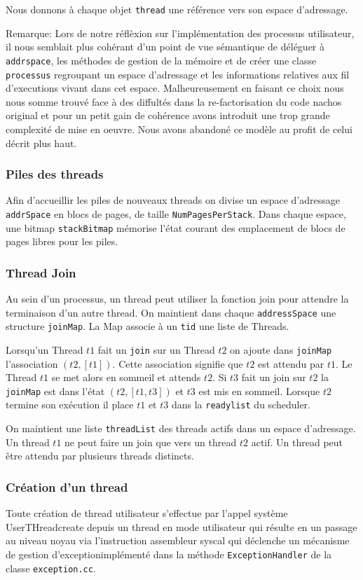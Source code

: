 \documentclass[11pt]{article}
\begin{document}
Nous donnons à chaque objet \texttt{thread} une référence vers son espace d'adressage.

Remarque: Lors de notre réflèxion sur l'implémentation des processus utilisateur, il nous semblait plus cohérant d'un point de vue sémantique de déléguer à \texttt{addrspace}, les méthodes de gestion de la mémoire
et de créer une classe \texttt{processus} regroupant un espace d'adressage et les informations relatives aux fil d'executions vivant dans cet espace. Malheureusement en faisant ce choix nous nous somme trouvé face à des diffultés dans la re-factorisation du code nachos original et pour un petit gain de cohérence avons introduit une trop grande complexité de mise en oeuvre. Nous avons abandoné ce modèle au profit de celui décrit plus haut.

\subsubsection{Piles des threads}
Afin d'accueillir les piles de nouveaux threads on divise un espace d'adressage \texttt{addrSpace} en blocs de pages, de taille \texttt{NumPagesPerStack}.
Dans chaque espace, une bitmap \texttt{stackBitmap} mémorise l'état courant des emplacement de blocs de pages libres pour les piles. 

\subsubsection{Thread Join}
Au sein d'un processus, un thread peut utiliser la fonction join pour attendre la terminaison d'un autre thread.
On maintient dans chaque \texttt{addressSpace} une structure \texttt{joinMap}.
La Map associe à un \texttt{tid} une liste de Threads.

Lorsqu'un Thread $t1$ fait un \texttt{join} sur un Thread $t2$ on ajoute dans \texttt{joinMap}
l'association $(t2, [t1])$. Cette association signifie que $t2$ est attendu par $t1$.
Le Thread $t1$ se met alors en sommeil et attends $t2$. 
Si $t3$ fait un join sur $t2$ la \texttt{joinMap} est dans l'état $(t2, [t1,t3])$ et $t3$ est mis en sommeil.
Lorsque $t2$ termine son exécution il place $t1$ et $t3$ dans la \texttt{readylist} du scheduler.

On maintient une liste \texttt{threadList} des threads actifs dans un espace d'adressage.
Un thread $t1$ ne peut faire un join que vers un thread $t2$ actif.
Un thread peut être attendu par plusieurs threads distincts.

\subsubsection{Création d'un thread}
Toute création de thread utilisateur s'effectue par l'appel système UserTHreadcreate
depuis un thread en mode utilisateur qui résulte en un passage au niveau noyau
via l'instruction assembleur syscal qui déclenche un mécanisme de gestion d'exceptionimplémenté dans la méthode \texttt{ExceptionHandler} de la classe  \texttt{exception.cc}.
\end{document}

